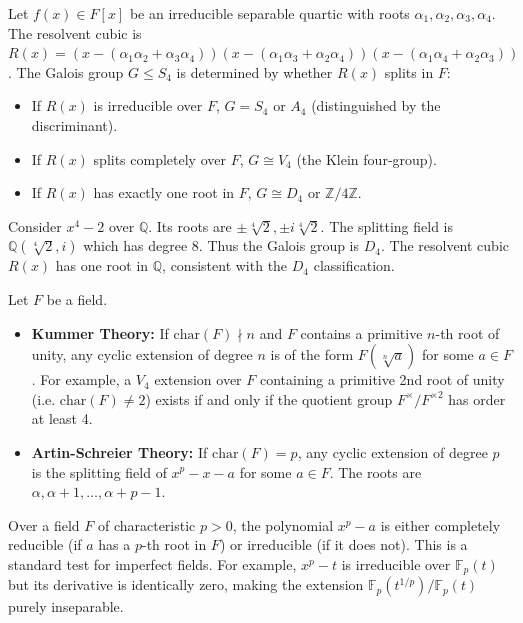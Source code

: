 \begin{theorem}
Let $f(x) \in F[x]$ be an irreducible separable quartic with roots $\alpha_1, \alpha_2, \alpha_3, \alpha_4$. The resolvent cubic is $R(x) = (x - (\alpha_1\alpha_2 + \alpha_3\alpha_4))(x - (\alpha_1\alpha_3 + \alpha_2\alpha_4))(x - (\alpha_1\alpha_4 + \alpha_2\alpha_3))$. The Galois group $G \le S_4$ is determined by whether $R(x)$ splits in $F$:
\begin{itemize}
    \item If $R(x)$ is irreducible over $F$, $G = S_4$ or $A_4$ (distinguished by the discriminant).
    \item If $R(x)$ splits completely over $F$, $G \cong V_4$ (the Klein four-group).
    \item If $R(x)$ has exactly one root in $F$, $G \cong D_4$ or $\mathbb{Z}/4\mathbb{Z}$.
\end{itemize}
\end{theorem}

\begin{example}
Consider $x^4-2$ over $\mathbb{Q}$. Its roots are $\pm \sqrt[4]{2}, \pm i\sqrt[4]{2}$. The splitting field is $\mathbb{Q}(\sqrt[4]{2}, i)$ which has degree 8. Thus the Galois group is $D_4$. The resolvent cubic $R(x)$ has one root in $\mathbb{Q}$, consistent with the $D_4$ classification.
\end{example}

\begin{theorem}
Let $F$ be a field.
\begin{itemize}
    \item \textbf{Kummer Theory:} If $\mathrm{char}(F) \nmid n$ and $F$ contains a primitive $n$-th root of unity, any cyclic extension of degree $n$ is of the form $F(\sqrt[n]{a})$ for some $a \in F$. For example, a $V_4$ extension over $F$ containing a primitive 2nd root of unity (i.e. $\mathrm{char}(F) \neq 2$) exists if and only if the quotient group $F^\times / F^{\times 2}$ has order at least 4.
    \item \textbf{Artin-Schreier Theory:} If $\mathrm{char}(F) = p$, any cyclic extension of degree $p$ is the splitting field of $x^p - x - a$ for some $a \in F$. The roots are $\alpha, \alpha+1, \dots, \alpha+p-1$.
\end{itemize}
\end{theorem}

\begin{remark}
Over a field $F$ of characteristic $p > 0$, the polynomial $x^p - a$ is either completely reducible (if $a$ has a $p$-th root in $F$) or irreducible (if it does not). This is a standard test for imperfect fields. For example, $x^p-t$ is irreducible over $\mathbb{F}_p(t)$ but its derivative is identically zero, making the extension $\mathbb{F}_p(t^{1/p}) / \mathbb{F}_p(t)$ purely inseparable.
\end{remark}

